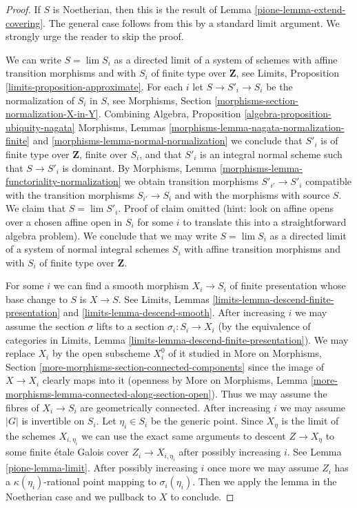\begin{proof}

If $S$ is Noetherian, then this is the result of
Lemma \ref{pione-lemma-extend-covering}. The general case
follows from this by a standard limit argument.
We strongly urge the reader to skip the proof.

\medskip\noindent
We can write $S = \lim S_i$ as a directed limit of a system
of schemes with affine transition morphisms and with $S_i$ of
finite type over $\mathbf{Z}$, see
Limits, Proposition \ref{limits-proposition-approximate}.
For each $i$ let $S \to S'_i \to S_i$ be the normalization
of $S_i$ in $S$, see
Morphisms, Section \ref{morphisms-section-normalization-X-in-Y}.
Combining Algebra, Proposition \ref{algebra-proposition-ubiquity-nagata}
Morphisms, Lemmas \ref{morphisms-lemma-nagata-normalization-finite} and
\ref{morphisms-lemma-normal-normalization}
we conclude that $S'_i$ is of finite type over $\mathbf{Z}$,
finite over $S_i$, and that $S'_i$ is an integral normal
scheme such that $S \to S'_i$ is dominant.
By Morphisms, Lemma \ref{morphisms-lemma-functoriality-normalization}
we obtain transition morphisms $S'_{i'} \to S'_i$ compatible
with the transition morphisms $S_{i'} \to S_i$ and with
the morphisms with source $S$.
We claim that $S = \lim S'_i$. Proof of claim omitted (hint:
look on affine opens over a chosen affine open in $S_i$
for some $i$ to translate this into a straightforward algebra
problem). We conclude that we may write $S = \lim S_i$
as a directed limit of a system of normal integral schemes $S_i$
with affine transition morphisms and with $S_i$ of
finite type over $\mathbf{Z}$.

\medskip\noindent
For some $i$ we can find a smooth morphism $X_i \to S_i$
of finite presentation whose base change to $S$ is $X \to S$.
See Limits, Lemmas
\ref{limits-lemma-descend-finite-presentation} and
\ref{limits-lemma-descend-smooth}.
After increasing $i$ we may assume the section
$\sigma$ lifts to a section $\sigma_i : S_i \to X_i$
(by the equivalence of categories in
Limits, Lemma \ref{limits-lemma-descend-finite-presentation}).
We may replace $X_i$ by the open subscheme $X_i^0$
of it studied in More on Morphisms, Section
\ref{more-morphisms-section-connected-components}
since the image of $X \to X_i$ clearly maps into it
(openness by More on Morphisms, Lemma
\ref{more-morphisms-lemma-connected-along-section-open}).
Thus we may assume the fibres of $X_i \to S_i$ are
geometrically connected.
After increasing $i$ we may assume $|G|$ is invertible
on $S_i$.
Let $\eta_i \in S_i$ be the generic point.
Since $X_\eta$ is the limit of the schemes
$X_{i, \eta_i}$ we can use the exact same arguments
to descent $Z \to X_\eta$ to some finite \'etale Galois
cover $Z_i \to X_{i, \eta_i}$ after possibly increasing $i$.
See Lemma \ref{pione-lemma-limit}.
After possibly increasing $i$ once more we may
assume $Z_i$ has a $\kappa(\eta_i)$-rational point
mapping to $\sigma_i(\eta_i)$.
Then we apply the lemma in the Noetherian case
and we pullback to $X$ to conclude.
\end{proof}

